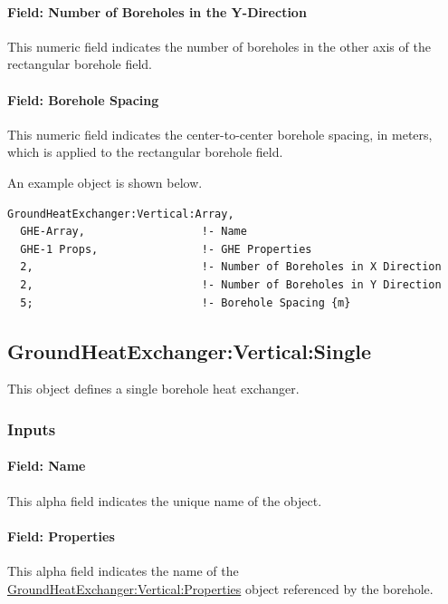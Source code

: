 \paragraph{Field: Number of Boreholes in the Y-Direction}

This numeric field indicates the number of boreholes in the other axis of the rectangular borehole field.

\paragraph{Field: Borehole Spacing}

This numeric field indicates the center-to-center borehole spacing, in meters, which is applied to the rectangular borehole field.

An example object is shown below.

\begin{lstlisting}
GroundHeatExchanger:Vertical:Array,
  GHE-Array,                  !- Name
  GHE-1 Props,                !- GHE Properties
  2,                          !- Number of Boreholes in X Direction
  2,                          !- Number of Boreholes in Y Direction
  5;                          !- Borehole Spacing {m}
\end{lstlisting}

\subsection{GroundHeatExchanger:Vertical:Single}\label{groundheatexchangerverticalsingle}

This object defines a single borehole heat exchanger.

\subsubsection{Inputs}

\paragraph{Field: Name}

This alpha field indicates the unique name of the object.

\paragraph{Field: Properties}

This alpha field indicates the name of the \hyperref[groundheatexchangerverticalproperties]{GroundHeatExchanger:Vertical:Properties} object referenced by the borehole.

